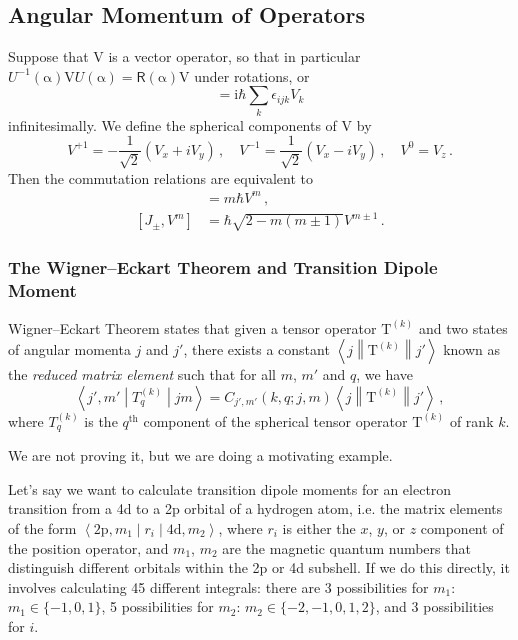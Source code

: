 \documentclass{article}
\theoremstyle{plain}\theoremheaderfont{\normalfont\itshape}\theorembodyfont{\rmfamily}\theoremseparator{.}\newtheorem*{rem}{Remark}\newtheorem*{ex}{Example}\newtheorem*{proof}{Proof}\newtheorem*{altp}{Alternative proof}
\theoremstyle{plain}\theoremheaderfont{\normalfont\bfseries}\theorembodyfont{\rmfamily}\theoremseparator{.}\newtheorem{thm}{Theorem}[section]\newtheorem{lem}[thm]{Lemma}\newtheorem{prop}[thm]{Proposition}\newtheorem*{cor}{Corollary}\newtheorem{defn}[thm]{Definition}\newtheorem{clm}[thm]{Claim}\newtheorem{clminproof}{Claim}
\theoremstyle{break}\theoremheaderfont{\normalfont\itshape}\theorembodyfont{\rmfamily}\theoremseparator{.\medskip}\newtheorem*{proofskip}{Proof}\newtheorem*{exs}{Examples}\newtheorem*{rems}{Remarks}
\theoremstyle{break}\theoremheaderfont{\normalfont\bfseries}\theorembodyfont{\rmfamily}\theoremseparator{.\medskip}\newtheorem{lemskip}[thm]{Lemma}\newtheorem{defnskip}[thm]{Definition}\newtheorem{propskip}[thm]{Proposition}\newtheorem{thmskip}[thm]{Theorem}
\numberwithin{equation}{section}
\newcommand{\ii}{\mathrm{i}}
\newcommand{\mel}[3]{\left\langle #1 \middle| #2 \middle| #3 \right\rangle}
\newcommand{\redmel}[3]{\left\langle #1 \middle\| #2 \middle\| #3 \right\rangle}
\newcommand{\vb}[1]{\bm{\mathrm{#1}}}
\begin{document}
    \subsection{Angular Momentum of Operators}
    Suppose that \(\vb{V}\) is a vector operator, so that in particular \(U^{-1}(\vb{\alpha})\vb{V}U(\vb{\alpha})=\mathsf{R}(\vb{\alpha})\vb{V}\) under rotations, or
    \begin{equation}
        [J_i,V_j]=\ii\hbar\sum_k\epsilon_{ijk}V_k
    \end{equation}
    infinitesimally. We define the spherical components of \(\vb{V}\) by
    \begin{equation}
        V^{+1}=-\frac{1}{\sqrt{2}}(V_x+iV_y)\,,\quad V^{-1}=\frac{1}{\sqrt{2}}(V_x-iV_y)\,,\quad V^0=V_z\,.
    \end{equation}
    Then the commutation relations are equivalent to
    \begin{align}
        [J_i,V^m]&=m\hbar V^m\,,\\
        [J_\pm,V^m]&=\hbar\sqrt{2-m(m\pm 1)}V^{m\pm 1}\,.
    \end{align}
    \subsubsection{The Wigner--Eckart Theorem and Transition Dipole Moment}
    Wigner--Eckart Theorem states that given a tensor operator \(\vb{T}^{(k)}\) and two states of angular momenta \(j\) and \(j'\), there exists a constant \(\redmel{j}{\vb{T}^{(k)}}{j'}\) known as the \textit{reduced matrix element} such that for all \(m\), \(m'\) and \(q\), we have
    \begin{equation}
        \mel{j',m'}{T_q^{(k)}}{jm}=C_{j',m'}(k,q;j,m)\redmel{j}{\vb{T}^{(k)}}{j'}\,,
    \end{equation}
    where \(T_q^{(k)}\) is the \(q^{\text{th}}\) component of the spherical tensor operator \(\vb{T}^{(k)}\) of rank \(k\).

    We are not proving it, but we are doing a motivating example.

    Let's say we want to calculate transition dipole moments for an electron transition from a 4d to a 2p orbital of a hydrogen atom, i.e. the matrix elements of the form  \(\mel{\mathrm{2p},m_1}{r_i}{\mathrm{4d},m_2}\), where \(r_i\) is either the \(x\), \(y\), or \(z\) component of the position operator, and \(m_1\), \(m_2\) are the magnetic quantum numbers that distinguish different orbitals within the 2p or 4d subshell. If we do this directly, it involves calculating 45 different integrals: there are 3 possibilities for \(m_1\): \(m_1\in\{-1, 0, 1\}\), 5 possibilities for \(m_2\): \(m_2\in\{-2, -1, 0, 1, 2\}\), and 3 possibilities for \(i\).
\end{document}
